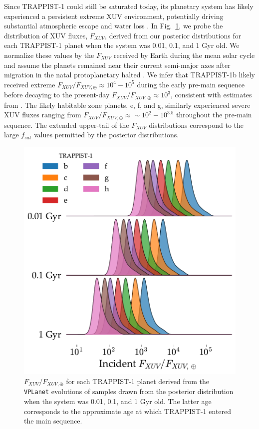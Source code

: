 \documentclass[twocolumn]{aastex62}
\newcommand{\vplanet}[0]{\texttt{VPLanet}\xspace}
\begin{document}
Since TRAPPIST-1 could still be saturated today, its planetary system has likely experienced a persistent extreme XUV environment, potentially driving substantial atmospheric escape and water loss \citep[][]{Luger2015,Bolmont2017,Bourrier2017a}. In Fig.~\ref{fig:fluxes}, we probe the distribution of XUV fluxes, $F_{XUV}$, derived from our posterior distributions for each TRAPPIST-1 planet when the system was 0.01, 0.1, and 1 Gyr old. We normalize these values by the $F_{XUV}$ received by Earth during the mean solar cycle \citep[$F_{XUV,\oplus} = 3.88$ erg s$^{-1}$cm$^{-2}$,][]{Ribas2005} and assume the planets remained near their current semi-major axes after migration in the natal protoplanetary halted \citep{Luger2017}. We infer that TRAPPIST-1b likely received extreme $F_{XUV}/F_{XUV, \oplus} \approx 10^4-10^5$ during the early pre-main sequence before decaying to the present-day $F_{XUV}/F_{XUV, \oplus} \approx 10^3$, consistent with estimates from \citet{Wheatley2017}. The likely habitable zone planets, e, f, and g, similarly experienced severe XUV fluxes ranging from $F_{XUV}/F_{XUV, \oplus} \approx {\sim} 10^2 - 10^{3.5}$ throughout the pre-main sequence. The extended upper-tail of the $F_{XUV}$ distributions correspond to the large $f_{sat}$ values permitted by the posterior distributions.

\begin{figure}[]
	\includegraphics[width=\columnwidth]{../Analysis/Fluxes/fluxes.pdf}
   \caption{$F_{XUV}/F_{XUV,\oplus}$ for each TRAPPIST-1 planet derived from the \vplanet evolutions of samples drawn from the posterior distribution when the system was 0.01, 0.1, and 1 Gyr old. The latter age corresponds to the approximate age at which TRAPPIST-1 entered the main sequence.}%
    \label{fig:fluxes}%
\end{figure}
\end{document}
